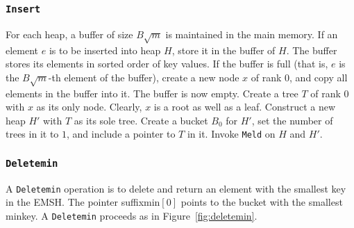 \subsubsection{{\tt Insert}}
For each heap, a buffer of size $B\sqrt{m}$ is maintained in the main memory. 
If an element $e$ is to be inserted into heap $H$, store it in the buffer of $H$. 
The buffer stores its elements in sorted order of key values. 
If the buffer is full (that is, $e$ is the $B\sqrt{m}$-th  element of the buffer), 
	create a new node $x$ of rank $0$, and copy all elements in the buffer into it.
The buffer is now empty.
Create a tree $T$ of rank $0$ with $x$ as its only node. 
Clearly, $x$ is a root as well as a leaf. 
Construct a new heap $H'$ with $T$ as its sole tree. 
Create a bucket $B_0$ for $H'$, set the number of trees in it to $1$, and include a pointer to $T$ in it.
Invoke {\tt Meld} on $H$ and $H'$.

\subsubsection{{\tt Deletemin}}
A {\tt Deletemin} operation is to delete and return an element with the smallest key in the EMSH.
The pointer suffixmin$[0]$ points to the bucket with the smallest minkey.
A {\tt Deletemin} proceeds as in Figure~\ref{fig:deletemin}.

